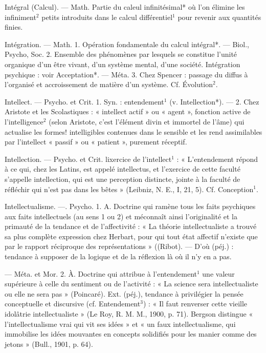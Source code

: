 Intégral (Calcul). — Math. Partie du
caleul infinitésimal* où l’on élimine
les infiniment$^2$ petits introduits dans
le calcul différentiel$^1$ pour revenir
aux quantités finies.

Intégration. — Math. 1. Opération
fondamentale du calcul intégral*.
— Biol., Psycho, Soc. 2. Ensemble des phénomènes par lesquels
se constitue l'unité organique d’un
être vivant, d’un système mental,
d’une société. Intégration psychique :
voir Acceptation*.
— Méta. 3. Chez Spencer : passage du diffus à l’organisé et accroissement de matière d'un système.
Cf. Évolution$^2$.

Intellect. — Psycho. et Crit. 1. Syn. :
entendement$^1$ (v. Intellection*). —
2. Chez Aristote et les Scolastiques :
« intellect actif » ou « agent »,
fonction active de l'intelligence$^2$ (selon Aristote, c’est l'élément divin et
immortel de l’âme) qui actualise les
formes! intelligibles contenues dans
le sensible et les rend assimilables
par l'intellect « passif » ou « patient », purement réceptif.

Intellection. — Psycho. et Crit. lixercice de l’intellect$^1$ : « L’entendement
répond à ce qui, chez les Latins,
est appelé intellectus, et l'exercice
de cette faculté s’appelle intellection,
qui est une perception distincte,
jointe à la faculté de réfléchir
qui n’est pas dans les bêtes »
(Leibniz, N. E., I, 21, 5). Cf. Conception$^1$.

Intellectualisme. —. Psycho. 1. A.
Doctrine qui ramène tous les faits
psychiques aux faits intellectuels
(au sens 1 ou 2) et méconnaît ainsi
l'originalité et la primauté de la
tendance et de l’affectivité : « La
théorie intellectualiste a trouvé sa
plus complète expression chez Herbart, pour qui tout état affectif
n'existe que par le rapport réciproque
des représentations » ((Ribot).
— D'où (péj.) : tendance à supposer
de la logique et de la réflexion là où
il n'y en a pas.

— Méta. et Mor. 2. À. Doctrine
qui attribue à l’entendement$^1$ une
valeur supérieure à celle du sentiment ou de l’activité : « La science
sera intellectualiste ou elle ne sera
pas » (Poincaré). Ext. (péj.), tendance à privilégier la pensée conceptuelle et discursive (cf. Entendement$^3$) : « Il faut renverser cette
vieille idolâtrie intellectualiste »
(Le Roy, R. M. M., 1900, p. 71).
Bergson distingue « l’intellectualisme vrai qui vit ses idées » et « un
faux intellectualisme, qui immobilise les idées mouvantes en concepts
solidifiés pour les manier comme
des jetons » (Bull., 1901, p. 64).

